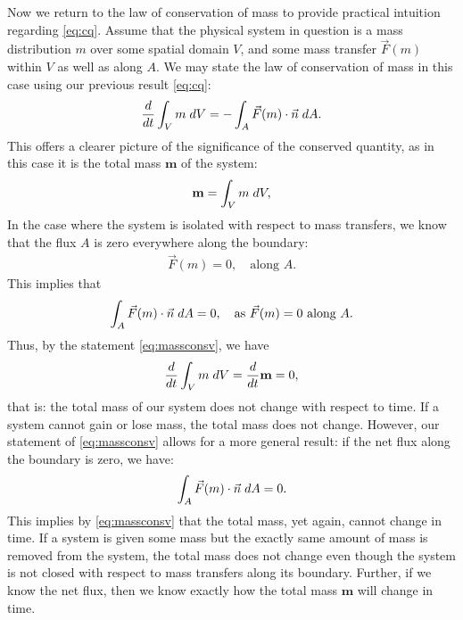 \documentclass[../main.tex]{subfiles}
\begin{document}
\noindent Now we return to the law of conservation of mass to provide practical intuition regarding \ref{eq:cq}. Assume that the physical system in question is a mass distribution $m$ over some spatial domain $V$, and some mass transfer $\vec F(m)$ within $V$ as well as along $A$. We may state the law of conservation of mass in this case using our previous result \ref{eq:cq}:
\begin{gather}\label{eq:massconsv}
    \frac{d}{dt} \int_V m\hspace*{0.10 cm} dV = - \int_A \vec F(m) \cdot \vec n \hspace*{0.10 cm}dA.
\end{gather}
This offers a clearer picture of the significance of the conserved quantity, as in this case it is the total mass $\mathbf{m}$ of the system:
\begin{gather*}
    \mathbf{m} = \int_V m \hspace*{0.10 cm }dV,
\end{gather*}
In the case where the system is isolated with respect to mass transfers, we know that the flux $A$ is zero everywhere along the boundary:
\begin{gather*}
    \vec F(m) = 0,\quad\text{along } A.
\end{gather*}
This implies that
\begin{gather*}
    \int_A \vec F(m) \cdot \vec n \hspace*{0.10 cm}dA = 0,\quad\text{as } \vec F(m) = 0\text{ along } A.\\
\end{gather*}
Thus, by the statement \ref{eq:massconsv}, we have
\begin{gather*}
    \frac{d}{dt}\int_V m\hspace*{0.10 cm} dV = \frac{d}{dt}\mathbf{m} = 0,
\end{gather*}
that is: the total mass of our system does not change with respect to time. If a system cannot gain or lose mass, the total mass does not change. However, our statement of \ref{eq:massconsv} allows for a more general result: if the net flux along the boundary is zero, we have:
\begin{gather*}
    \int_A \vec F(m) \cdot \vec n \hspace*{0.10 cm}dA = 0.
\end{gather*}
This implies by \ref{eq:massconsv} that the total mass, yet again, cannot change in time. If a system is given some mass but the exactly same amount of mass is removed from the system, the total mass does not change even though the system is not closed with respect to mass transfers along its boundary. Further, if we know the net flux, then we know exactly how the total mass $\mathbf{m}$ will change in time.
\end{document}

